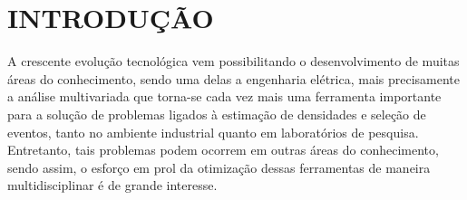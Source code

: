 \chapter{INTRODUÇÃO}





\label{cap:intro}

A crescente evolução tecnológica vem possibilitando o desenvolvimento de muitas áreas do conhecimento, sendo uma delas a engenharia elétrica, mais precisamente a análise multivariada \cite{vicini2005analise} que torna-se cada vez mais uma ferramenta importante para a solução de problemas ligados à estimação de densidades e seleção de eventos, tanto no ambiente industrial quanto em laboratórios de pesquisa. Entretanto, tais problemas podem ocorrem em outras áreas do conhecimento, sendo assim, o esforço em prol da otimização dessas ferramentas de maneira multidisciplinar é de grande interesse.

